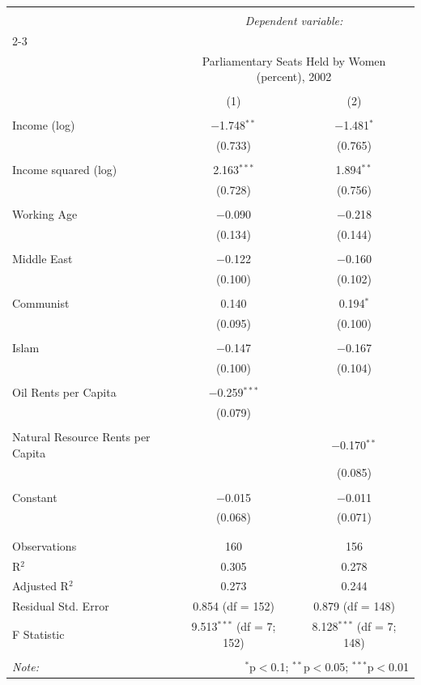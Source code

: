 \documentclass[12pt,letterpaper]{article}
\begin{document}
\begin{table}[!htbp] \centering 
	\label{} 
	\begin{tabular}{@{\extracolsep{5pt}}lcc} 
		\\[-1.8ex]\hline 
		\hline \\[-1.8ex] 
		& \multicolumn{2}{c}{\textit{Dependent variable:}} \\ 
		\cline{2-3} 
		\\[-1.8ex] & \multicolumn{2}{c}{Parliamentary Seats Held by Women (percent), 2002} \\ 
		\\[-1.8ex] & (1) & (2)\\ 
		\hline \\[-1.8ex] 
		Income (log) & $-$1.748$^{**}$ & $-$1.481$^{*}$ \\ 
		& (0.733) & (0.765) \\ 
		& & \\ 
		Income squared (log) & 2.163$^{***}$ & 1.894$^{**}$ \\ 
		& (0.728) & (0.756) \\ 
		& & \\ 
		Working Age & $-$0.090 & $-$0.218 \\ 
		& (0.134) & (0.144) \\ 
		& & \\ 
		Middle East & $-$0.122 & $-$0.160 \\ 
		& (0.100) & (0.102) \\ 
		& & \\ 
		Communist & 0.140 & 0.194$^{*}$ \\ 
		& (0.095) & (0.100) \\ 
		& & \\ 
		Islam & $-$0.147 & $-$0.167 \\ 
		& (0.100) & (0.104) \\ 
		& & \\ 
		Oil Rents per Capita & $-$0.259$^{***}$ &  \\ 
		& (0.079) &  \\ 
		& & \\ 
		Natural Resource Rents per Capita &  & $-$0.170$^{**}$ \\ 
		&  & (0.085) \\ 
		& & \\ 
		Constant & $-$0.015 & $-$0.011 \\ 
		& (0.068) & (0.071) \\ 
		& & \\ 
		\hline \\[-1.8ex] 
		Observations & 160 & 156 \\ 
		R$^{2}$ & 0.305 & 0.278 \\ 
		Adjusted R$^{2}$ & 0.273 & 0.244 \\ 
		Residual Std. Error & 0.854 (df = 152) & 0.879 (df = 148) \\ 
		F Statistic & 9.513$^{***}$ (df = 7; 152) & 8.128$^{***}$ (df = 7; 148) \\ 
		\hline 
		\hline \\[-1.8ex] 
		\textit{Note:}  & \multicolumn{2}{r}{$^{*}$p$<$0.1; $^{**}$p$<$0.05; $^{***}$p$<$0.01} \\ 
	\end{tabular} 
\end{table} 
\end{document}
